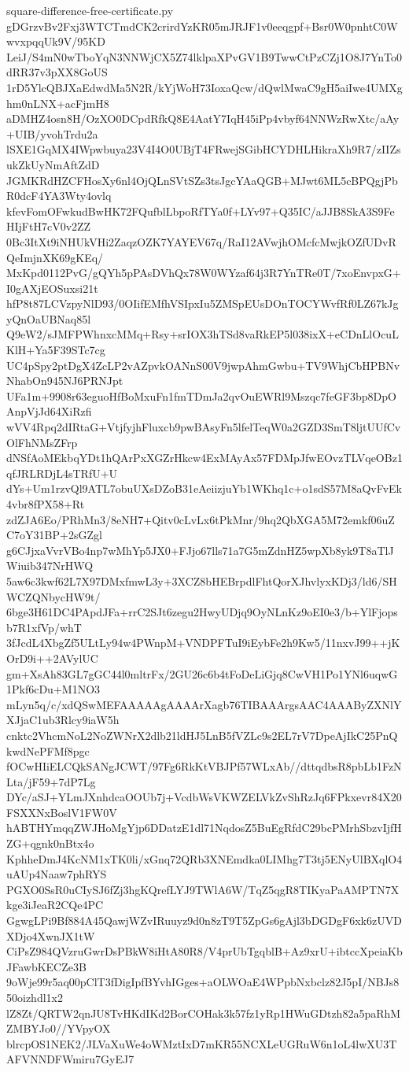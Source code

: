 \documentclass[11pt]{article}
\theoremstyle{definition}
\theoremstyle{remark}
\begin{document}
\begin{filecontents*}[overwrite]{square-difference-free-certificate.py}
gDGrzvBv2Fxj3WTCTmdCK2crirdYzKR05mJRJF1v0eeqgpf+Bsr0W0pnhtC0WwvxpqqUk9V/95KD
LeiJ/S4mN0wTboYqN3NNWjCX5Z74lklpaXPvGV1B9TwwCtPzCZj1O8J7YnTo0dRR37v3pXX8GoUS
1rD5YlcQBJXaEdwdMa5N2R/kYjWoH73IoxaQcw/dQwlMwaC9gH5aiIwe4UMXghm0nLNX+acFjmH8
aDMHZ4osn8H/OzXO0DCpdRfkQ8E4AatY7IqH45iPp4vbyf64NNWzRwXtc/aAy+UIB/yvohTrdu2a
lSXE1GqMX4IWpwbuya23V4I4O0UBjT4FRwejSGibHCYDHLHikraXh9R7/zIIZsukZkUyNmAftZdD
JGMKRdHZCFHosXy6nl4OjQLnSVtSZs3tsJgcYAaQGB+MJwt6ML5cBPQgjPbR0dcF4YA3Wty4ovlq
kfevFomOFwkudBwHK72FQufblLbpoRfTYa0f+LYv97+Q35IC/aJJB8SkA3S9FeHIjFtH7cV0v2ZZ
0Bc3ItXt9iNHUkVHi2ZaqzOZK7YAYEV67q/RaI12AVwjhOMcfcMwjkOZfUDvRQeImjnXK69gKEq/
MxKpd0112PvG/gQYh5pPAsDVhQx78W0WYzaf64j3R7YnTRe0T/7xoEnvpxG+I0gAXjEOSuxsi21t
hfP8t87LCVzpyNlD93/0OIifEMfhVSIpxIu5ZMSpEUsDOnTOCYWvfRf0LZ67kJgyQnOaUBNaq85l
Q9eW2/sJMFPWhnxcMMq+Rsy+srIOX3hTSd8vaRkEP5l038ixX+eCDnLlOcuLKlH+Ya5F39STc7cg
UC4pSpy2ptDgX4ZcLP2vAZpvkOANnS00V9jwpAhmGwbu+TV9WhjCbHPBNvNhabOn945NJ6PRNJpt
UFa1m+9908r63eguoHfBoMxuFn1fmTDmJa2qvOuEWRl9Mszqc7feGF3bp8DpOAnpVjJd64XiRzfi
wVV4Rpq2dIRtaG+VtjfyjhFluxcb9pwBAsyFn5lfelTeqW0a2GZD3SmT8ljtUUfCvOlFhNMsZFrp
dNSfAoMEkbqYDt1hQArPxXGZrHkcw4ExMAyAx57FDMpJfwEOvzTLVqeOBz1qfJRLRDjL4sTRfU+U
dYs+Um1rzvQl9ATL7obuUXsDZoB31eAeiizjuYb1WKhq1c+o1sdS57M8aQvFvEk4vbr8fPX58+Rt
zdZJA6Eo/PRhMn3/8eNH7+Qitv0cLvLx6tPkMnr/9hq2QbXGA5M72emkf06uZC7oY31BP+2sGZgl
g6CJjxaVvrVBo4np7wMhYp5JX0+FJjo67lls71a7G5mZdnHZ5wpXb8yk9T8aTlJWiuib347NrHWQ
5aw6c3kwf62L7X97DMxfmwL3y+3XCZ8bHEBrpdlFhtQorXJhvlyxKDj3/ld6/SHWCZQNbycHW9t/
6bge3H61DC4PApdJFa+rrC2SJt6zegu2HwyUDjq9OyNLnKz9oEI0e3/b+YlFjopsb7R1xfVp/whT
3fJcdL4XbgZf5ULtLy94w4PWnpM+VNDPFTuI9iEybFe2h9Kw5/11nxvJ99++jKOrD9i++2AVylUC
gm+XsAh83GL7gGC44l0mltrFx/2GU26c6b4tFoDeLiGjq8CwVH1Po1YNl6uqwG1Pkf6cDu+M1NO3
mLyn5q/c/xdQSwMEFAAAAAgAAAArXagb76TIBAAArgsAAC4AAAByZXNlYXJjaC1ub3Rlcy9iaW5h
cnktc2VhcmNoL2NoZWNrX2dlb21ldHJ5LnB5fVZLc9s2EL7rV7DpeAjIkC25PnQkwdNePFMf8pgc
fOCwHIiELCQkSANgJCWT/97Fg6RkKtVBJPf57WLxAb//dttqdbsR8pbLb1FzNLta/jF59+7dP7Lg
DYc/aSJ+YLmJXnhdcaOOUb7j+VcdbWsVKWZELVkZvShRzJq6FPkxevr84X20FSXXNxBoslV1FW0V
hABTHYmqqZWJHoMgYjp6DDatzE1dl71NqdosZ5BuEgRfdC29bcPMrhSbzvIjfHZG+qgnk0nBtx4o
KphheDmJ4KcNM1xTK0li/xGnq72QRb3XNEmdka0LIMhg7T3tj5ENyUlBXqlO4uAUp4Naaw7phRYS
PGXO0SsR0uCIySJ6fZj3hgKQrefLYJ9TWlA6W/TqZ5qgR8TIKyaPaAMPTN7Xkge3iJeaR2CQe4PC
GgwgLPi9Bf884A45QawjWZvIRuuyz9d0n8zT9T5ZpGs6gAjl3bDGDgF6xk6zUVDXDjo4XwnJX1tW
CiPsZ984QVzruGwrDsPBkW8iHtA80R8/V4prUbTgqblB+Az9xrU+ibtccXpeiaKbJFawbKECZe3B
9oWje99r5aq00pClT3fDigIpfBYvhIGges+aOLWOaE4WPpbNxbclz82J5pI/NBJs850oizhdl1x2
lZ8Zt/QRTW2qnJU8TvHKdIKd2BorCOHak3k57fz1yRp1HWuGDtzh82a5paRhMZMBYJo0//YVpyOX
blrcpOS1NEK2/JLVaXuWe4oWMztIxD7mKR55NCXLeUGRuW6n1oL4lwXU3TAFVNNDFWmiru7GyEJ7

\end{filecontents*}
\end{document}
